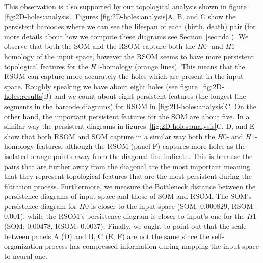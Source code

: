 This observation is also supported by our topological analysis shown in figure \ref{fig:2D-holes:analysis}. Figures
\ref{fig:2D-holes:analysis}A, B, and C show the persistent barcodes where we can see the lifespan of each (birth, death)
pair (for more details about how we compute these diagrams see Section~\ref{sec:tda}). We observe that both the SOM and
the RSOM capture both the $H0$- and $H1$-homology of the input space, however the RSOM seems to have more persistent 
topological features for the $H1$-homology (orange lines). This means that the RSOM can capture more accurately the 
holes which are present in the input space. Roughly speaking we have about eight holes (see figure~\ref{fig:2D-holes:results}B) and we count about eight persistent features (the longest line segments
in the barcode diagrams) for RSOM in \ref{fig:2D-holes:analysis}C. On the other hand, the important persistent features
for the SOM are about five. In a similar way the persistent diagrams in figures~\ref{fig:2D-holes:analysis}C, D, and E
show that both RSOM and SOM capture in a similar way both the $H0$- and $H1$-homology features, although the 
RSOM (panel F) captures more holes as the isolated orange points away from the diagonal line indicate. This
is because the pairs that are further away from the diagonal are the most important meaning that they represent 
topological features that are the most persistent during the filtration process. 
Furthermore, we measure the Bottleneck distance between the persistence diagrams of input space and those of 
SOM and RSOM. The SOM's persistence diagram for $H0$ is closer to the input space (SOM: $0.000829$, RSOM: $0.001$),
while the RSOM's persistence diagram is closer to input's one for the $H1$ (SOM: $0.00478$, RSOM: $0.0037$). 
Finally, we ought to point out that the scale between panels A (D) and B, C (E, F) are not the same since the 
self-organization process has compressed information during mapping the input space to neural one.


